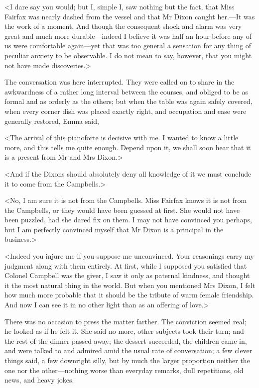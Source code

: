 <I dare say you would; but I, simple I, saw nothing but the fact, that Miss Fairfax was nearly dashed from the vessel and that Mr Dixon caught her.—It was the work of a moment. And though the consequent shock and alarm was very great and much more durable—indeed I believe it was half an hour before any of us were comfortable again—yet that was too general a sensation for any thing of peculiar anxiety to be observable. I do not mean to say, however, that you might not have made discoveries.>

The conversation was here interrupted. They were called on to share in the awkwardness of a rather long interval between the courses, and obliged to be as formal and as orderly as the others; but when the table was again safely covered, when every corner dish was placed exactly right, and occupation and ease were generally restored, Emma said,

<The arrival of this pianoforte is decisive with me. I wanted to know a little more, and this tells me quite enough. Depend upon it, we shall soon hear that it is a present from Mr and Mrs Dixon.>

<And if the Dixons should absolutely deny all knowledge of it we must conclude it to come from the Campbells.>

<No, I am sure it is not from the Campbells. Miss Fairfax knows it is not from the Campbells, or they would have been guessed at first. She would not have been puzzled, had she dared fix on them. I may not have convinced you perhaps, but I am perfectly convinced myself that Mr Dixon is a principal in the business.>

<Indeed you injure me if you suppose me unconvinced. Your reasonings carry my judgment along with them entirely. At first, while I supposed you satisfied that Colonel Campbell was the giver, I saw it only as paternal kindness, and thought it the most natural thing in the world. But when you mentioned Mrs Dixon, I felt how much more probable that it should be the tribute of warm female friendship. And now I can see it in no other light than as an offering of love.>

There was no occasion to press the matter farther. The conviction seemed real; he looked as if he felt it. She said no more, other subjects took their turn; and the rest of the dinner passed away; the dessert succeeded, the children came in, and were talked to and admired amid the usual rate of conversation; a few clever things said, a few downright silly, but by much the larger proportion neither the one nor the other—nothing worse than everyday remarks, dull repetitions, old news, and heavy jokes.

